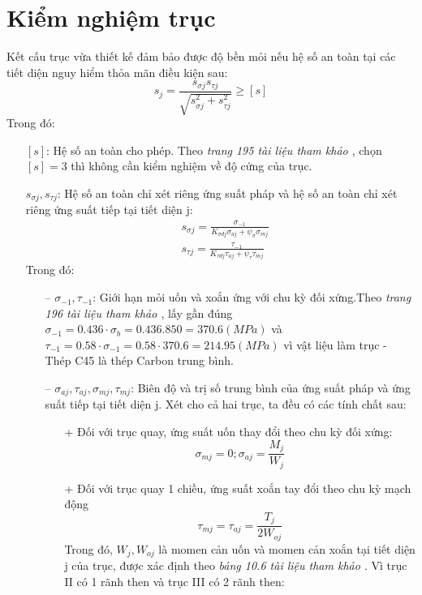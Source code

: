     \section{Kiểm nghiệm trục}
        \hspace*{0.6cm}Kết cấu trục vừa thiết kế đảm bảo được độ bền mỏi nếu hệ số an toàn tại các tiết diện nguy hiểm thỏa mãn điều kiện sau:
        $$s_j = \frac{s_{\sigma j}s_{\tau j}}{\sqrt{s^2_{\sigma j}+ s^2_{\tau j}}} \geq [s]$$
        Trong đó:
        \begin{itemize}
            \item[] $[s]$: Hệ số an toàn cho phép. Theo \textit{trang 195 tài liệu tham khảo \cite{tltk1}}, chọn $[s] = 3$ thì không cần kiểm nghiệm về độ cứng của trục.
            \item[] $s_{\sigma j}, s_{\tau j}$: Hệ số an toàn chỉ xét riêng ứng suất pháp và hệ số an toàn chỉ xét riêng ứng suất tiếp tại tiết diện j:
            \begin{align*}
                &s_{\sigma j} = \frac{\sigma_{-1}}{K_{\sigma dj}\sigma_{aj} + \psi_\sigma \sigma_{mj}} \\
                &s_{\tau j} = \frac{\tau_{-1}}{K_{\tau dj}\tau_{aj} + \psi_\tau \tau_{mj}}
            \end{align*}
            Trong đó:
            \begin{itemize}
                \item[--] $\sigma_{-1}, \tau_{-1}$: Giới hạn mỏi uốn và xoắn ứng với chu kỳ đối xứng.Theo \textit{trang 196 tài liệu tham khảo \cite{tltk1}}, lấy gần đúng $\sigma_{-1} = 0.436 \cdot \sigma_b = 0.436.850 = 370.6 (MPa)$ và $\tau_{-1} = 0.58 \cdot \sigma_{-1} = 0.58 \cdot 370.6 = 214.95 (MPa)$ vì vật liệu làm trục - Thép C45 là thép Carbon trung bình.
                \item[--] $\sigma_{aj}, \tau_{aj}, \sigma_{mj}, \tau_{mj}$: Biên độ và trị số trung bình của ứng suất pháp và ứng suất tiếp tại tiết diện j. Xét cho cả hai trục, ta đều có các tính chất sau:
                \begin{itemize}
                    \item[+] Đối với trục quay, ứng suất uốn thay đổi theo chu kỳ đối xứng:
                    $$\sigma_{mj} = 0; \sigma_{aj} = \frac{M_j}{W_j}$$
                    \item[+] Đối với trục quay 1 chiều, ứng suất xoắn tay đổi theo chu kỳ mạch động
                    $$\tau_{mj} = \tau_{aj} = \frac{T_j}{2W_{oj}}$$
                    Trong đó, $W_j, W_{oj}$ là momen cản uốn và momen cản xoắn tại tiết diện j của trục, được xác định theo \textit{bảng 10.6 tài liệu tham khảo \cite{tltk1}}. Vì trục II có 1 rãnh then và trục III có 2 rãnh then:

\end{itemize}
\end{itemize}
\end{itemize}
